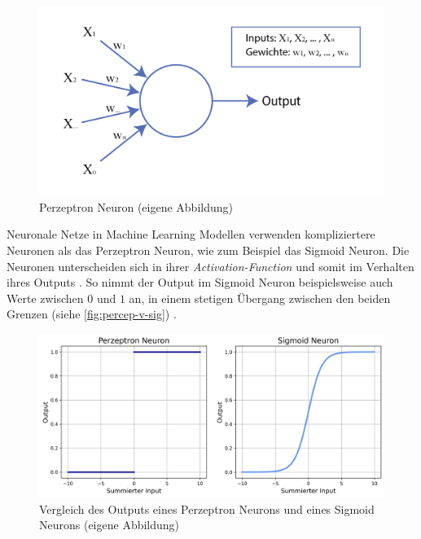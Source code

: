 \begin{figure}[!ht]
   \centering
   \includegraphics[width=\textwidth]{images/theorie/neuron.png}
   \caption{Perzeptron Neuron (eigene Abbildung)}\label{fig:neuron}
\end{figure}
 
Neuronale Netze in Machine Learning Modellen verwenden kompliziertere Neuronen
als das Perzeptron Neuron, wie zum Beispiel das Sigmoid Neuron. Die Neuronen
unterscheiden sich in ihrer \emph{Activation-Function} und somit im Verhalten ihres
Outputs \cite{pragati_baheti_activation_2022}. So nimmt der Output im Sigmoid Neuron
beispielsweise auch Werte zwischen $0$ und $1$ an, in einem stetigen Übergang
zwischen den beiden Grenzen (siehe \autoref{fig:percep-v-sig}) \cite{kumar_sigmoid_2019}.

\newpage
\begin{figure}[!ht]
   \centering
   \includegraphics[width=\textwidth]{images/theorie/percep-v-sig.png}
   \caption{Vergleich des Outputs eines Perzeptron Neurons und eines Sigmoid Neurons (eigene Abbildung)}\label{fig:percep-v-sig}
\end{figure}
 
